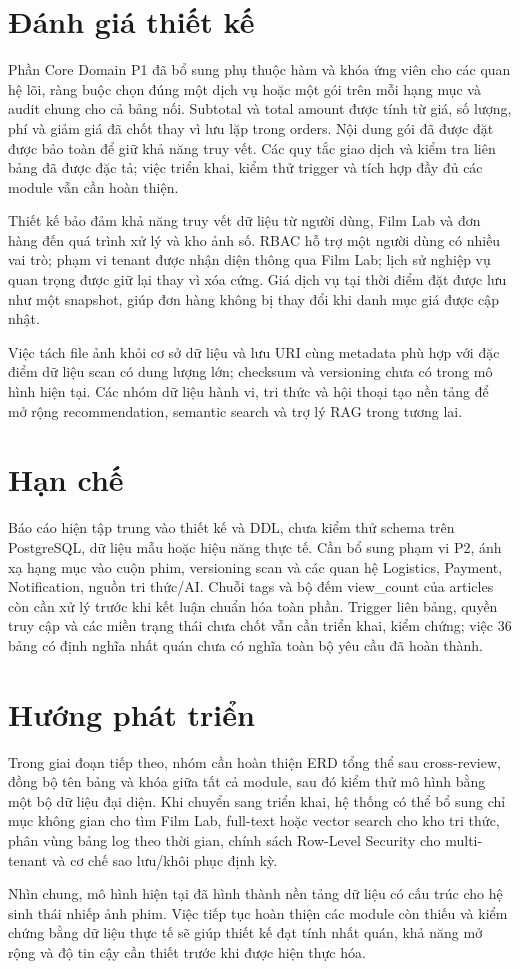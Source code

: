 \section{Đánh giá thiết kế}

Phần Core Domain P1 đã bổ sung phụ thuộc hàm và khóa ứng viên cho các
quan hệ lõi, ràng buộc chọn đúng một dịch vụ hoặc một gói trên mỗi hạng
mục và audit chung cho cả bảng nối. Subtotal và total amount được tính
từ giá, số lượng, phí và giảm giá đã chốt thay vì lưu lặp trong orders.
Nội dung gói đã được đặt được bảo toàn để giữ khả năng truy vết.
Các quy tắc giao dịch và kiểm tra liên bảng đã được đặc tả; việc triển
khai, kiểm thử trigger và tích hợp đầy đủ các module vẫn cần hoàn thiện.

Thiết kế bảo đảm khả năng truy vết dữ liệu từ người dùng, Film Lab và đơn hàng đến quá trình xử lý và kho ảnh số. RBAC hỗ trợ một người dùng có nhiều vai trò; phạm vi tenant được nhận diện thông qua Film Lab; lịch sử nghiệp vụ quan trọng được giữ lại thay vì xóa cứng. Giá dịch vụ tại thời điểm đặt được lưu như một snapshot, giúp đơn hàng không bị thay đổi khi danh mục giá được cập nhật.

Việc tách file ảnh khỏi cơ sở dữ liệu và lưu URI cùng metadata phù hợp với đặc điểm dữ liệu scan có dung lượng lớn; checksum và versioning chưa có trong mô hình hiện tại. Các nhóm dữ liệu hành vi, tri thức và hội thoại tạo nền tảng để mở rộng recommendation, semantic search và trợ lý RAG trong tương lai.

\section{Hạn chế}

Báo cáo hiện tập trung vào thiết kế và DDL, chưa kiểm thử schema trên PostgreSQL, dữ liệu mẫu hoặc hiệu năng thực tế. Cần bổ sung phạm vi P2, ánh xạ hạng mục vào cuộn phim, versioning scan và các quan hệ Logistics, Payment, Notification, nguồn tri thức/AI. Chuỗi tags và bộ đếm view\_count của articles còn cần xử lý trước khi kết luận chuẩn hóa toàn phần. Trigger liên bảng, quyền truy cập và các miền trạng thái chưa chốt vẫn cần triển khai, kiểm chứng; việc 36 bảng có định nghĩa nhất quán chưa có nghĩa toàn bộ yêu cầu đã hoàn thành.

\section{Hướng phát triển}

Trong giai đoạn tiếp theo, nhóm cần hoàn thiện ERD tổng thể sau cross-review, đồng bộ tên bảng và khóa giữa tất cả module, sau đó kiểm thử mô hình bằng một bộ dữ liệu đại diện. Khi chuyển sang triển khai, hệ thống có thể bổ sung chỉ mục không gian cho tìm Film Lab, full-text hoặc vector search cho kho tri thức, phân vùng bảng log theo thời gian, chính sách Row-Level Security cho multi-tenant và cơ chế sao lưu/khôi phục định kỳ.

Nhìn chung, mô hình hiện tại đã hình thành nền tảng dữ liệu có cấu trúc cho hệ sinh thái nhiếp ảnh phim. Việc tiếp tục hoàn thiện các module còn thiếu và kiểm chứng bằng dữ liệu thực tế sẽ giúp thiết kế đạt tính nhất quán, khả năng mở rộng và độ tin cậy cần thiết trước khi được hiện thực hóa.
